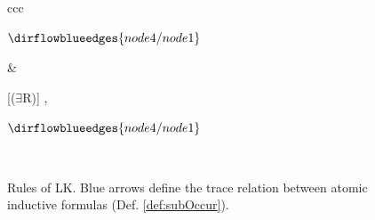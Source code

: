 \begin{figure}
\begin{mdframed}
{\begin{tabular}{ccc}
\begin{minipage}{0.3\textwidth}
    $
    \dirflowblueedges{node4/node1}
    $
    
  \end{minipage} &
  \begin{minipage}{0.3\textwidth}
    \centering
    
    \begin{prooftree}
        [($\exists$R)]{ \vdash {}, } 
    \end{prooftree}

    $
    \dirflowblueedges{node4/node1}
    $
    
  \end{minipage}
  \\[1em]

\end{tabular}
}
\end{mdframed}
 
  \caption{Rules of LK. Blue arrows define the trace relation between 
  atomic inductive formulas (Def. \ref{def:subOccur}).}
   \label{LKrules}
\end{figure}